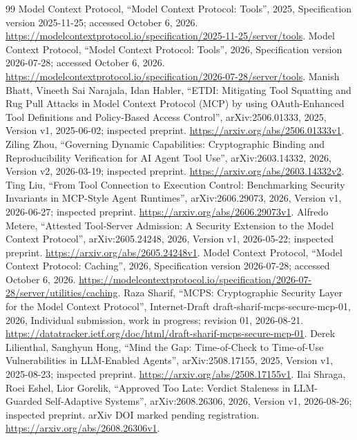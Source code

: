 \begin{thebibliography}{99}
 Model Context Protocol, ``Model Context Protocol: Tools'', 2025, Specification version 2025-11-25; accessed October 6, 2026. \url{https://modelcontextprotocol.io/specification/2025-11-25/server/tools}.
 Model Context Protocol, ``Model Context Protocol: Tools'', 2026, Specification version 2026-07-28; accessed October 6, 2026. \url{https://modelcontextprotocol.io/specification/2026-07-28/server/tools}.
 Manish Bhatt, Vineeth Sai Narajala, Idan Habler, ``ETDI: Mitigating Tool Squatting and Rug Pull Attacks in Model Context Protocol (MCP) by using OAuth-Enhanced Tool Definitions and Policy-Based Access Control'', arXiv:2506.01333, 2025, Version v1, 2025-06-02; inspected preprint. \url{https://arxiv.org/abs/2506.01333v1}.
 Ziling Zhou, ``Governing Dynamic Capabilities: Cryptographic Binding and Reproducibility Verification for AI Agent Tool Use'', arXiv:2603.14332, 2026, Version v2, 2026-03-19; inspected preprint. \url{https://arxiv.org/abs/2603.14332v2}.
 Ting Liu, ``From Tool Connection to Execution Control: Benchmarking Security Invariants in MCP-Style Agent Runtimes'', arXiv:2606.29073, 2026, Version v1, 2026-06-27; inspected preprint. \url{https://arxiv.org/abs/2606.29073v1}.
 Alfredo Metere, ``Attested Tool-Server Admission: A Security Extension to the Model Context Protocol'', arXiv:2605.24248, 2026, Version v1, 2026-05-22; inspected preprint. \url{https://arxiv.org/abs/2605.24248v1}.
 Model Context Protocol, ``Model Context Protocol: Caching'', 2026, Specification version 2026-07-28; accessed October 6, 2026. \url{https://modelcontextprotocol.io/specification/2026-07-28/server/utilities/caching}.
 Raza Sharif, ``MCPS: Cryptographic Security Layer for the Model Context Protocol'', Internet-Draft draft-sharif-mcps-secure-mcp-01, 2026, Individual submission, work in progress; revision 01, 2026-08-21. \url{https://datatracker.ietf.org/doc/html/draft-sharif-mcps-secure-mcp-01}.
 Derek Lilienthal, Sanghyun Hong, ``Mind the Gap: Time-of-Check to Time-of-Use Vulnerabilities in LLM-Enabled Agents'', arXiv:2508.17155, 2025, Version v1, 2025-08-23; inspected preprint. \url{https://arxiv.org/abs/2508.17155v1}.
 Ilai Shraga, Roei Eshel, Lior Gorelik, ``Approved Too Late: Verdict Staleness in LLM-Guarded Self-Adaptive Systems'', arXiv:2608.26306, 2026, Version v1, 2026-08-26; inspected preprint. arXiv DOI marked pending registration. \url{https://arxiv.org/abs/2608.26306v1}.

\end{thebibliography}
